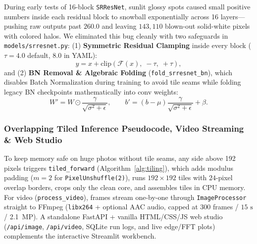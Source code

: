 \documentclass[10pt,onecolumn,journal]{IEEEtran}
\begin{document}
During early tests of 16-block \texttt{SRResNet}, sunlit glossy spots caused small positive numbers inside each residual block to snowball exponentially across 16 layers---pushing raw outputs past $260.0$ and leaving $143{,}110$ blown-out solid-white pixels with colored halos. We eliminated this bug cleanly with two safeguards in \texttt{models/srresnet.py}: (1) \textbf{Symmetric Residual Clamping} inside every block ($\tau=4.0$ default, $8.0$ in YAML):
\begin{equation}
y = x + \mathrm{clip}\!\left(\mathcal{F}(x),\; -\tau,\; +\tau\right),
\label{eq:clamp}
\end{equation}
and (2) \textbf{BN Removal \& Algebraic Folding} (\texttt{fold\_srresnet\_bn}), which disables Batch Normalization during training to avoid tile seams while folding legacy BN checkpoints mathematically into conv weights:
\begin{equation}
W' = W \odot \frac{\gamma}{\sqrt{\sigma^2+\epsilon}}, \qquad b' = (b - \mu)\frac{\gamma}{\sqrt{\sigma^2+\epsilon}} + \beta.
\label{eq:bnfold}
\end{equation}

\subsubsection{Overlapping Tiled Inference Pseudocode, Video Streaming \& Web Studio}
To keep memory safe on huge photos without tile seams, any side above 192 pixels triggers \texttt{tiled\_forward} (Algorithm~\ref{alg:tiling}), which adds modulus padding ($m=2$ for \texttt{PixelUnshuffle(2)}), runs $192\times192$ tiles with $24$-pixel overlap borders, crops only the clean core, and assembles tiles in CPU memory. For video (\texttt{process\_video}), frames stream one-by-one through \texttt{ImageProcessor} straight to FFmpeg (\texttt{libx264} + optional AAC audio, capped at 300 frames / $15\text{ s}$ / 2.1~MP). A standalone FastAPI + vanilla HTML/CSS/JS web studio (\texttt{/api/image}, \texttt{/api/video}, SQLite run logs, and live edge/FFT plots) complements the interactive Streamlit workbench.
\end{document}
